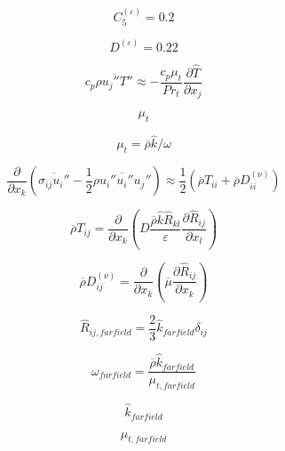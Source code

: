 \begin{equation}
C_5^{(\varepsilon)} = 0.2
\end{equation}

\begin{equation}
D^{(\varepsilon)} = 0.22
\end{equation}

\begin{equation}
c_p \overline {\rho u_j'' T''} \approx
-\frac{c_p \mu_t}{Pr_t} \frac{\partial \hat T}{\partial x_j}
\end{equation}

\begin{equation}
\mu_t
\end{equation}

\begin{equation}
\mu_t=\overline \rho \hat k / \omega
\end{equation}

\begin{equation}
\frac{\partial}{\partial x_k} \left(
\overline{\sigma_{ij} u_i''} - \frac{1}{2} \overline{\rho u_i'' u_i'' u_j''} \right) \approx
\frac{1}{2} \left( \overline \rho T_{ii} + \overline \rho D_{ii}^{(\nu)} \right)
\end{equation}

\begin{equation}
\overline \rho T_{ij} = \frac{\partial}{\partial x_k} \left(
D \frac{\overline \rho \hat k \hat R_{kl}}{\varepsilon}
\frac{\partial \hat R_{ij}}{\partial x_l} \right)
\end{equation}

\begin{equation}
\overline \rho D_{ij}^{(\nu)} = \frac{\partial}{\partial x_k} \left(
\overline \mu \frac{\partial \hat R_{ij}}{\partial x_k} \right)
\end{equation}

\begin{equation}
\hat R_{ij, farfield} = \frac{2}{3} \hat k_{farfield} \delta_{ij}
\end{equation}

\begin{equation}
\omega_{farfield} = \frac{\overline \rho \hat k_{farfield}}{\mu_{t, farfield}}
\end{equation}

\begin{equation}
\hat k_{farfield}
\end{equation}

\begin{equation}
\mu_{t, farfield}
\end{equation}

